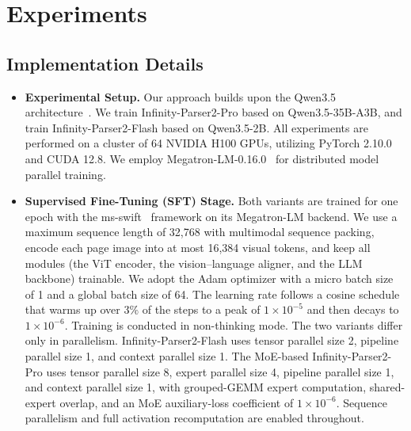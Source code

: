 \section{Experiments}

\subsection{Implementation Details}

\begin{itemize}[
  leftmargin=1.0em,
  labelsep=0.5em
]
\item \textbf{Experimental Setup.} Our approach builds upon the Qwen3.5 architecture~\cite{qwen3.5}. We train Infinity-Parser2-Pro based on Qwen3.5-35B-A3B, and train Infinity-Parser2-Flash based on Qwen3.5-2B. All experiments are performed on a cluster of 64 NVIDIA H100 GPUs, utilizing PyTorch 2.10.0 and CUDA 12.8. We employ Megatron-LM-0.16.0~\cite{shoeybi2020megatronlmtrainingmultibillionparameter} for distributed model parallel training.

\item \textbf{Supervised Fine-Tuning (SFT) Stage.} Both variants are trained for one epoch with the ms-swift~\cite{zhao2025swift} framework on its Megatron-LM backend. We use a maximum sequence length of 32,768 with multimodal sequence packing, encode each page image into at most 16,384 visual tokens, and keep all modules (the ViT encoder, the vision--language aligner, and the LLM backbone) trainable. We adopt the Adam optimizer with a micro batch size of 1 and a global batch size of 64. The learning rate follows a cosine schedule that warms up over $3\%$ of the steps to a peak of $1 \times 10^{-5}$ and then decays to $1 \times 10^{-6}$. Training is conducted in non-thinking mode. The two variants differ only in parallelism. Infinity-Parser2-Flash uses tensor parallel size 2, pipeline parallel size 1, and context parallel size 1. The MoE-based Infinity-Parser2-Pro uses tensor parallel size 8, expert parallel size 4, pipeline parallel size 1, and context parallel size 1, with grouped-GEMM expert computation, shared-expert overlap, and an MoE auxiliary-loss coefficient of $1 \times 10^{-6}$. Sequence parallelism and full activation recomputation are enabled throughout.


\end{itemize}
